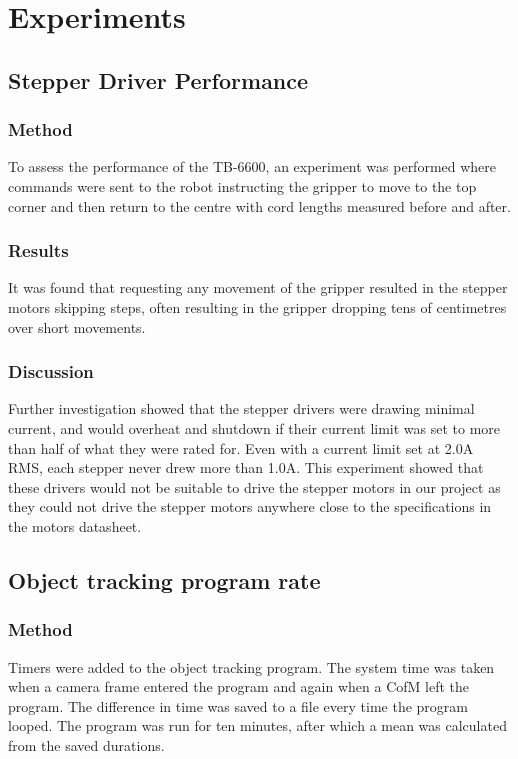 \documentclass[conference]{IEEEtran}
\begin{document}
	\section{Experiments}\label{experiments}
	\subsection{Stepper Driver Performance}
	\subsubsection{Method}
	To assess the performance of the TB-6600, an experiment was performed where commands were sent to the robot instructing the gripper to move to the top corner and then return to the centre with cord lengths measured before and after. 
	\subsubsection{Results}
	It was found that requesting any movement of the gripper resulted in the stepper motors skipping steps, often resulting in the gripper dropping tens of centimetres over short movements. 
	\subsubsection{Discussion}
	Further investigation showed that the stepper drivers were drawing minimal current, and would overheat and shutdown if their current limit was set to more than half of what they were rated for. Even with a current limit set at 2.0A RMS, each stepper never drew more than 1.0A. This experiment showed that these drivers would not be suitable to drive the stepper motors in our project as they could not drive the stepper motors anywhere close to the specifications in the	 motors datasheet.
	
		
		\subsection{Object tracking program rate}
		\subsubsection{Method}
		Timers were added to the object tracking program. The system time was taken when a camera frame entered the program and again when a CofM left the program. The difference in time was saved to a file every time the program looped. The program was run for ten minutes, after which a mean was calculated from the saved durations.
\end{document}
